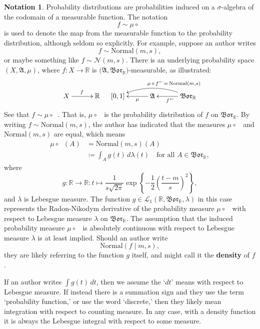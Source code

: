 \documentclass[
twoside=true,
paper=letter,
fontsize=9pt,
pagesize=auto,
leqno,
openany,
headsepline,
overfullrule,
]{scrbook}
\theoremstyle{plain}
\theoremstyle{plain}
\theoremstyle{definition}
\newtheorem{notn}[thm]{Notation}
\theoremstyle{bfnoteitalic}
\theoremstyle{bfnoteroman}
\newcommand{\term}[1]{\textbf{#1}\index{#1}}
\newcommand{\sigalg}[1]{\mathfrak{#1}}
\newcommand{\cali}[1]{\mathscr{#1}}
\newcommand{\definedby}{\coloneqq}
\newcommand{\borel}{\mathfrak{Bor}}
\newcommand{\textsigma}{\hbox{\large{$\sigma$}}\kern-1pt}
\newcommand{\preimage}[1]{\mathop{#1^{\leftarrow}}}
\newcommand{\R}{\mathbb{R}}
\newcommand{\sigmaalgebra}{\sigalg{A}}
\newcommand{\funcf}{f}
\newcommand{\funcg}{g}
\newcommand{\function}{f}
\newcommand{\functionii}{g}
\newcommand{\measurespace}{X}
\newcommand{\measure}{\mu}
\newcommand{\measmu}{\mu}
\newcommand{\measlambda}{\lambda}
\newcommand{\seti}{A}
\begin{document}
\begin{notn}\label{density_functions}
Probability distributions are probabilities induced on a \textsigma-algebra of the codomain of a measurable function. The notation
\[
\function \sim \measure\circ\preimage{\function}
\]
is used to denote the map from the measurable function to the probability distribution, although seldom so explicitly.
For example, suppose an author writes 
\[
\function\sim \text{Normal}(m,s),
\]
or maybe something like $\function\sim \cali{N}(m,s)$.
There is an underlying probability space
$(\measurespace,\sigmaalgebra,\measmu)$, where 
$\funcf:\measurespace\to\R$
is  
$\bigl(\sigmaalgebra,\borel_\R \bigr)$\hyp{}measurable,
as illustrated:
\[
\xymatrix@R=18pt@C=30pt{\measurespace \ar[r]^\funcf & \R \\}
\quad
\xymatrix@R=18pt@C=30pt{
[0,1]
& \sigmaalgebra 
\ar[l]^-\measmu
& \borel_\R
\ar[l]^{\preimage{\funcf}} 
\ar@/_12pt/[ll]_{\measmu\,\circ\,
\funcf
\makebox[0pt][l]{$\scriptstyle{^\leftarrow =\, \text{Normal}(m,s)}$}}
}
\]
%
%
%
See that
$\function\sim \measmu\circ \preimage{\function}$.
That is, $\measmu\circ \preimage{\function}$ is the probability distribution of $\function$ on 
$\borel_\R$.
By writing $\function\sim \text{Normal}(m,s)$, the author has indicated that the measures 
$\measmu\circ \preimage{\function}$ and
$\text{Normal}(m,s)$ are equal,
which means
\begin{align*}
\measmu\circ \preimage{\function}(\seti) 
&= \text{Normal}(m,s)(\seti) \\
&\definedby\int_\seti \functionii(t)\,d\lambda(t)\quad\text{for all $\seti\in\borel_\R$},
\end{align*}
where 
\[
\functionii :\R\to\R:
t\mapsto
\frac{1}{s\sqrt{2\pi}}
\exp
\left\{
-\frac{1}{2}
\left(
\frac{t-m}{s}
\right)^2
\right\},
\]
and $\measlambda$ is Lebesgue measure.
The function 
$\functionii \in\cali{L}_1(\R,\borel_\R,\lambda)$
in this case represents the Radon-Nikodym derivative of the probability measure
$\measmu \circ \preimage{\function}$
with respect to Lebesgue measure $\lambda$ on $\borel_\R$.
The assumption that the induced probability measure
$\measmu\circ \preimage{\function}$
is absolutely continuous with respect to Lebesgue measure $\measlambda$ is at least implied.
Should an author write 
\[\text{Normal}(\function\mid m,s),\] they are likely referring to the function $\functionii$ itself, and might call it the \term{density} of $\function$. 

If an author  writes $\int \funcg(t)\,dt$, then we assume the `$dt$' means with respect to Lebesgue measure. If instead there is a summation sign and they use the term `probability function,' or use the word `discrete,' then they likely mean integration with respect to counting measure.  In any case, with a density function it is always the Lebesgue integral with respect to some measure.
\end{notn}
\end{document}
